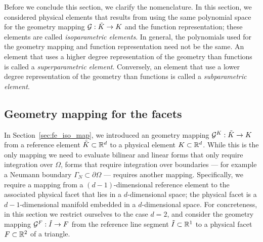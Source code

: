 Before we conclude this section, we clarify the nomenclature.  In this section, we considered physical elements that results from using the same polynomial space for the geometry mapping $\mathcal{G}: \tilde K \to K$ and the function representation; these elements are called \emph{isoparametric elements}. In general, the polynomials used for the geometry mapping and function representation need not be the same.   An element that uses a higher degree representation of the geometry than functions is called a \emph{superparametric element}. Conversely, an element that use a lower degree representation of the geometry than functions is called a \emph{subparametric element}.

\subsection{Geometry mapping for the facets}
In Section~\ref{sec:fe_iso_map}, we introduced an geometry mapping $\mathcal{G}^K: \tilde K \to K$ from a reference element $\tilde K \subset \mathbb{R}^d$ to a physical element $K \subset \mathbb{R}^d$.  While this is the only mapping we need to evaluate bilinear and linear forms that only require integration over $\Omega$, forms that require integration over boundaries --- for example a Neumann boundary $\Gamma_N \subset \partial \Omega$ --- requires another mapping. Specifically, we require a mapping from a $(d-1)$-dimensional reference element to the associated physical facet that lies in a $d$-dimensional space; the physical facet is a $d-1$-dimensional manifold embedded in a $d$-dimensional space.  For concreteness, in this section we restrict ourselves to the case $d=2$, and consider the geometry mapping $\mathcal{G}^F: \tilde I \to F$ from the reference line segment $\tilde I \subset \mathbb{R}^1$ to a physical facet $F \subset \mathbb{R}^2$ of a triangle.

